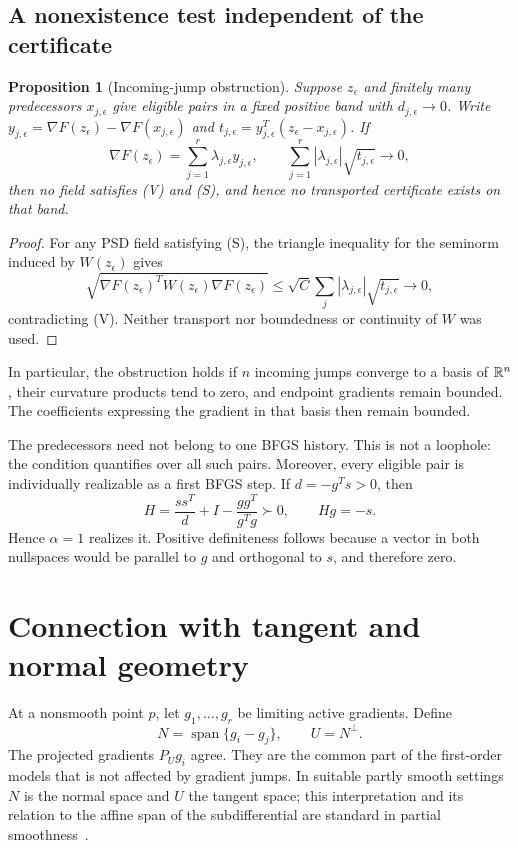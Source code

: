 \documentclass[10pt,oneside,openany]{book}
\newtheorem{proposition}{Proposition}[chapter]
\theoremstyle{remark}\newtheorem{remark}{Remark}[chapter]
\begin{document}
\subsection{A nonexistence test independent of the certificate}
\begin{proposition}[Incoming-jump obstruction]\label{G:prop:star}
Suppose $z_\epsilon$ and finitely many predecessors $x_{j,\epsilon}$ give eligible pairs in a fixed positive band with $d_{j,\epsilon}\to0$. Write $y_{j,\epsilon}=\nabla F(z_\epsilon)-\nabla F(x_{j,\epsilon})$ and $t_{j,\epsilon}=y_{j,\epsilon}^T(z_\epsilon-x_{j,\epsilon})$. If
\[
 \nabla F(z_\epsilon)=\sum_{j=1}^r\lambda_{j,\epsilon}y_{j,\epsilon},
 \qquad
 \sum_{j=1}^r|\lambda_{j,\epsilon}|\sqrt{t_{j,\epsilon}}\longrightarrow0,
\]
then no field satisfies (V) and (S), and hence no transported certificate exists on that band.
\end{proposition}
\begin{proof}
For any PSD field satisfying (S), the triangle inequality for the seminorm induced by $W(z_\epsilon)$ gives
\[
 \sqrt{\nabla F(z_\epsilon)^TW(z_\epsilon)\nabla F(z_\epsilon)}
 \le\sqrt C\sum_j|\lambda_{j,\epsilon}|\sqrt{t_{j,\epsilon}}\to0,
\]
contradicting (V). Neither transport nor boundedness or continuity of $W$ was used.
\end{proof}
In particular, the obstruction holds if $n$ incoming jumps converge to a basis of $\mathbb R^n$, their curvature products tend to zero, and endpoint gradients remain bounded. The coefficients expressing the gradient in that basis then remain bounded.

The predecessors need not belong to one BFGS history. This is not a loophole: the condition quantifies over all such pairs. Moreover, every eligible pair is individually realizable as a first BFGS step. If $d=-g^Ts>0$, then
\[
 H=\frac{ss^T}{d}+I-\frac{gg^T}{g^Tg}\succ0,\qquad Hg=-s.
\]
Hence $\alpha=1$ realizes it. Positive definiteness follows because a vector in both nullspaces would be parallel to $g$ and orthogonal to $s$, and therefore zero.


\setcounter{section}{3}
\setcounter{theorem}{0}
\setcounter{equation}{4}
\section{Connection with tangent and normal geometry}
At a nonsmooth point $p$, let $g_1,\dots,g_r$ be limiting active gradients. Define
\[
 N=\operatorname{span}\{g_i-g_j\},\qquad U=N^\perp.
\]
The projected gradients $P_Ug_i$ agree. They are the common part of the first-order models that is not affected by gradient jumps. In suitable partly smooth settings $N$ is the normal space and $U$ the tangent space; this interpretation and its relation to the affine span of the subdifferential are standard in partial smoothness~\cite{LL}.
\end{document}
